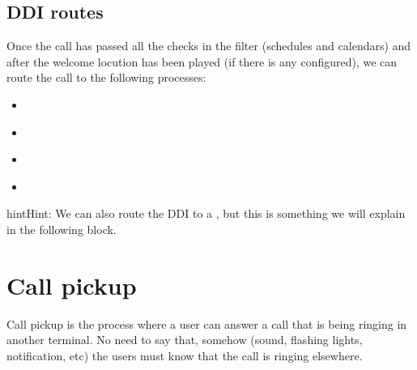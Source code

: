 \documentclass[letterpaper,10pt,english]{sphinxmanual}
\begin{document}
\subsection{DDI routes}
\label{pbx_features/external_ddis:routing-logics}\label{pbx_features/external_ddis:ddi-routes}
Once the call has passed all the checks in the filter (schedules and calendars)
and after the welcome locution has been played (if there is any configured),
we can route the call to the following processes:
\begin{itemize}
\item {} 
{\hyperref[pbx_features/huntgroups:huntgroups]{}}

\end{itemize}

\noindent{}
\begin{itemize}
\item {} 
{\hyperref[pbx_features/ivrs:generic\string-ivrs]{}}

\end{itemize}

\noindent{}
\begin{itemize}
\item {} 
{\hyperref[pbx_features/ivrs:custom\string-ivrs]{}}

\end{itemize}

\noindent{}
\begin{itemize}
\item {} 
{\hyperref[pbx_features/conference_rooms:conference\string-rooms]{}}

\end{itemize}

\noindent{}

\begin{notice}{hint}{Hint:}
We can also route the DDI to a {\hyperref[faxing/index:faxing\string-system]{}}, but
this is something we will explain in the following block.
\end{notice}


\section{Call pickup}
\label{pbx_features/call_captures:capture-groups}\label{pbx_features/call_captures::doc}\label{pbx_features/call_captures:call-pickup}
Call pickup is the process where a user can answer a call that is being ringing
in another terminal. No need to say that, somehow (sound, flashing lights,
notification, etc) the users must know that the call is ringing elsewhere.
\end{document}
